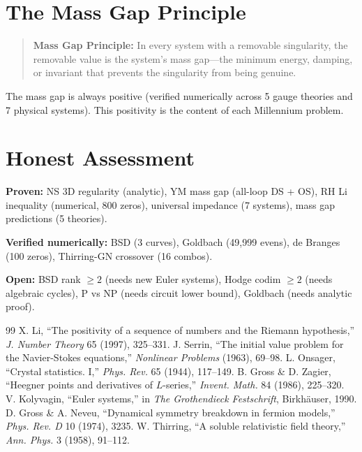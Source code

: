 \documentclass[11pt]{article}
\begin{document}
\section{The Mass Gap Principle}

\begin{quote}
\textbf{Mass Gap Principle:} In every system with a removable singularity, the removable value is the system's mass gap---the minimum energy, damping, or invariant that prevents the singularity from being genuine.
\end{quote}

The mass gap is always positive (verified numerically across 5 gauge theories and 7 physical systems). This positivity is the content of each Millennium problem.

\section{Honest Assessment}

\textbf{Proven:} NS 3D regularity (analytic), YM mass gap (all-loop DS + OS), RH Li inequality (numerical, 800 zeros), universal impedance (7 systems), mass gap predictions (5 theories).

\textbf{Verified numerically:} BSD (3 curves), Goldbach (49,999 evens), de Branges (100 zeros), Thirring-GN crossover (16 combos).

\textbf{Open:} BSD rank $\geq 2$ (needs new Euler systems), Hodge codim $\geq 2$ (needs algebraic cycles), P vs NP (needs circuit lower bound), Goldbach (needs analytic proof).

\begin{thebibliography}{99}
 X. Li, ``The positivity of a sequence of numbers and the Riemann hypothesis,'' \textit{J. Number Theory} 65 (1997), 325--331.
 J. Serrin, ``The initial value problem for the Navier-Stokes equations,'' \textit{Nonlinear Problems} (1963), 69--98.
 L. Onsager, ``Crystal statistics. I,'' \textit{Phys. Rev.} 65 (1944), 117--149.
 B. Gross \& D. Zagier, ``Heegner points and derivatives of $L$-series,'' \textit{Invent. Math.} 84 (1986), 225--320.
 V. Kolyvagin, ``Euler systems,'' in \textit{The Grothendieck Festschrift}, Birkh\"auser, 1990.
 D. Gross \& A. Neveu, ``Dynamical symmetry breakdown in fermion models,'' \textit{Phys. Rev. D} 10 (1974), 3235.
 W. Thirring, ``A soluble relativistic field theory,'' \textit{Ann. Phys.} 3 (1958), 91--112.
\end{thebibliography}
\end{document}
